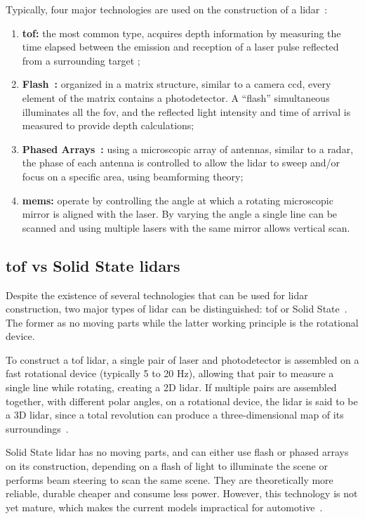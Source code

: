 Typically, four major technologies are used on the construction of a \ac{lidar}~\cite{Hecht2018, Sullivan2016}:

\begin{enumerate}
	\item \textbf{\ac{tof}:} the most common type, acquires depth information by measuring the time elapsed between the emission and reception of a \ac{laser} pulse reflected from a surrounding target \cite{Sullivan2016};
	\item \textbf{Flash~\cite{Ouster, Gelbart2002,Stettner2010, Simpson2019}:} organized in a matrix structure, similar to a camera \ac{ccd}, every element of the matrix contains a photodetector. A ``flash'' simultaneous illuminates all the \ac{fov}, and the reflected light intensity and time of arrival is measured to provide depth calculations; 
	\item \textbf{Phased Arrays~\cite{Quanergy2018, Yu2016}:} using a microscopic array of antennas, similar to a \ac{radar}, the phase of each antenna is controlled to allow the \ac{lidar} to sweep and/or focus on a specific area, using beamforming theory;
	\item \textbf{\ac{mems}:} operate by controlling the angle at which a rotating microscopic mirror is aligned with the \ac{laser}. By varying the angle a single line can be scanned and using multiple \acp{laser} with the same mirror allows vertical scan.
\end{enumerate}


\subsection{\acl{tof} vs Solid State \acp{lidar}}
Despite the existence of several technologies that can be used for \ac{lidar} construction, two major types of \ac{lidar} can be distinguished: \ac{tof} or Solid State~\cite{Hecht2018}. The former as no moving parts while the latter working principle is the rotational device.

To construct a \ac{tof} \ac{lidar}, a single pair of \ac{laser} and photodetector is assembled on a fast rotational device (typically 5 to 20 Hz), allowing that pair to measure a single line while rotating, creating a 2D \ac{lidar}. If multiple pairs are assembled together, with different polar angles, on a rotational device, the \ac{lidar} is said to be a 3D \ac{lidar}, since a total revolution can produce a three-dimensional map of its surroundings~\cite{Sullivan2016}.

Solid State \ac{lidar} has no moving parts, and can either use flash or phased arrays on its construction, depending on a flash of light to illuminate the scene or performs beam steering to scan the same scene. They are theoretically more reliable, durable cheaper and consume less power. However, this technology is not yet mature, which makes the current models impractical for automotive~\cite{Fersch2017a}. 

